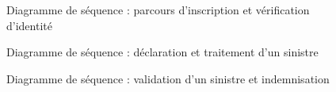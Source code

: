 \documentclass[12pt,a4paper]{report}
\begin{document}

\begin{figure}[H]
    \centering
    \caption{Diagramme de séquence : parcours d'inscription et vérification d'identité}
    \label{fig:seq-inscription}
\end{figure}

\begin{figure}[H]
    \centering
    \caption{Diagramme de séquence : déclaration et traitement d'un sinistre}
    \label{fig:seq-sinistre}
\end{figure}

\begin{figure}[H]
    \centering
    \caption{Diagramme de séquence : validation d'un sinistre et indemnisation}
    \label{fig:seq-validation}
\end{figure}
\end{document}
